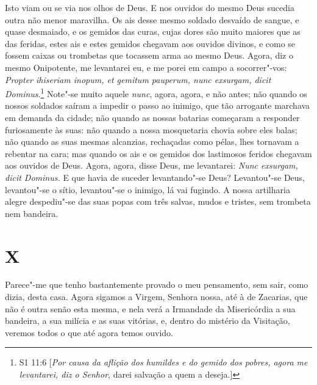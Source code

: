 Isto viam ou se via nos olhos de Deus. E nos ouvidos do mesmo Deus
sucedia outra não menor maravilha. Os ais desse mesmo soldado desvaído
de sangue, e quase desmaiado, e os gemidos das curas, cujas dores são
muito maiores que as das feridas, estes ais e estes gemidos chegavam aos
ouvidos divinos, e como se fossem caixas ou trombetas que tocassem arma
ao mesmo Deus. Agora, diz o mesmo Onipotente, me levantarei eu, e me
porei em campo a socorrer"-vos: \emph{Propter ihiseriam inopum, et
gemitum pauperum, nunc exsurgam, dicit Dominus}.\footnote{S1 11:6 [\textit{Por causa da aflição dos humildes e do gemido dos pobres, agora me levantarei, diz o Senhor}, darei salvação a quem a deseja.]} Note"-se
muito aquele \emph{nunc}, agora, agora, e não antes; não quando os
nossos soldados saíram a impedir o passo ao inimigo, que tão arrogante
marchava em demanda da cidade; não quando as nossas batarias começaram a
responder furiosamente às suas: não quando a nossa mosquetaria chovia
sobre eles balas; não quando as suas mesmas alcanzias, rechaçadas como
pélas, lhes tornavam a rebentar na cara; mas quando os ais e os gemidos
dos lastimosos feridos chegavam aos ouvidos de Deus.
Agora, agora, disse Deus, me levantarei: \emph{Nunc exsurgam, dicit
Dominus.} E que havia de suceder levantando"-se Deus? Levantou"-se Deus,
levantou"-se o sítio, levantou"-se o inimigo, lá vai fugindo. A nossa
artilharia alegre despediu"-se das suas popas com três salvas, mudos e
tristes, sem trombeta nem bandeira.

\section{X}

Parece"-me que tenho bastantemente provado o meu pensamento, sem sair,
como dizia, desta casa. Agora sigamos a Virgem, Senhora nossa, até à de
Zacarias, que não é outra senão esta mesma, e nela verá a Irmandade da
Misericórdia a sua bandeira, a sua milícia e as suas vitórias, e, dentro
do mistério da Visitação, veremos todos o que até agora temos
ouvido.


